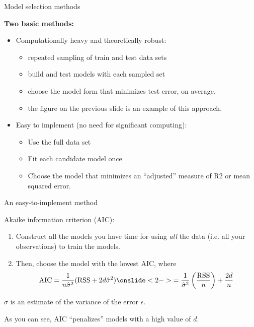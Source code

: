 \documentclass[aspectratio=169]{beamer}
\begin{document}
\begin{frame}{Model selection methods}

\textbf{Two basic methods:}
\vspace{5mm}
\begin{itemize}
\item Computationally heavy and theoretically robust: 
\begin{itemize}
\item repeated sampling of train and test data sets
\item build and test models with each sampled set
\item choose the model form that minimizes test error, on average.
\item the figure on the previous slide is an example of this approach.
\end{itemize}
\vspace{5mm}
\item Easy to implement (no need for significant computing):
\begin{itemize}
\item Use the full data set
\item Fit each candidate model once
\item Choose the model that minimizes an ``adjusted'' measure of R2 or mean squared error.
\end{itemize}
\end{itemize}
\end{frame}

\begin{frame}{An easy-to-implement method}

Akaike information criterion (AIC):

\begin{enumerate}
\item Construct all the models you have time for using \textit{all} the data (i.e. all your observations) to train the models.
\item Then, choose the model with the lowest AIC, where
\begin{align*}
\text{AIC} = \frac{1}{n\hat{\sigma}^2}(\text{RSS}+2d\hat{\sigma}^2) \onslide<2->{= \frac{1}{\hat{\sigma}^2}\left(\frac{\text{RSS}}{n}\right) + \frac{2d}{n}}
\end{align*}
\end{enumerate}

$\hat{\sigma}$ is an estimate of the variance of the error $\epsilon$.

\pause
\vspace*{5mm}
As you can see, AIC ``penalizes'' models with a high value of $d$.  
\end{frame}
\end{document}

